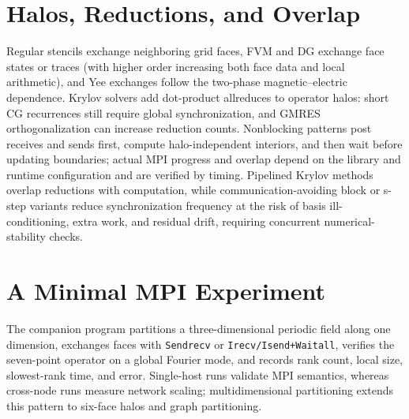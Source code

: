 \section{Halos, Reductions, and Overlap}
Regular stencils exchange neighboring grid faces, FVM and DG exchange face states or traces (with higher order increasing both face data and local arithmetic), and Yee exchanges follow the two-phase magnetic--electric dependence. Krylov solvers add dot-product allreduces to operator halos: short CG recurrences still require global synchronization, and GMRES orthogonalization can increase reduction counts.
Nonblocking patterns post receives and sends first, compute halo-independent interiors, and then wait before updating boundaries; actual MPI progress and overlap depend on the library and runtime configuration and are verified by timing.\cite{mpi}
Pipelined Krylov methods overlap reductions with computation, while communication-avoiding block or s-step variants reduce synchronization frequency at the risk of basis ill-conditioning, extra work, and residual drift, requiring concurrent numerical-stability checks.
\section{A Minimal MPI Experiment}
The companion program partitions a three-dimensional periodic field along one dimension, exchanges faces with \texttt{Sendrecv} or \texttt{Irecv/Isend+Waitall}, verifies the seven-point operator on a global Fourier mode, and records rank count, local size, slowest-rank time, and error. Single-host runs validate MPI semantics, whereas cross-node runs measure network scaling; multidimensional partitioning extends this pattern to six-face halos and graph partitioning.
